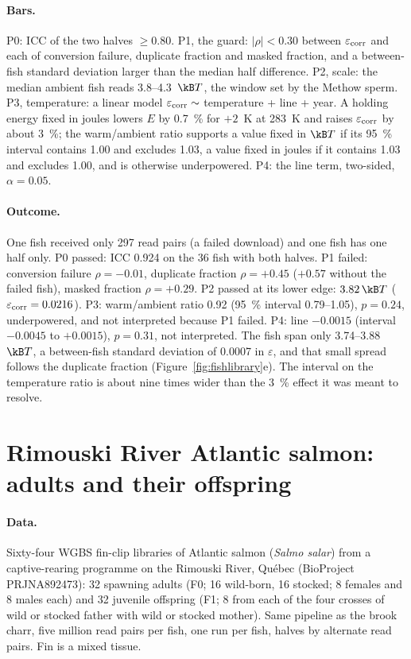\paragraph{Bars.} P0: ICC of the two halves $\ge0.80$. P1, the guard: $|\rho|<0.30$ between $\varepsilon_{\rm corr}$ and each of
conversion failure, duplicate fraction and masked fraction, and a between-fish standard deviation larger than the median
half difference. P2, scale: the median ambient fish reads 3.8--4.3~$\kB T$, the window set by the Methow sperm. P3, temperature:
a linear model $\varepsilon_{\rm corr}\sim$ temperature + line + year. A holding energy fixed in joules lowers $E$ by 0.7~\% for
$+2$~K at 283~K and raises $\varepsilon_{\rm corr}$ by about 3~\%; the warm/ambient ratio supports a value fixed in $\kB T$ if its
95~\% interval contains 1.00 and excludes 1.03, a value fixed in joules if it contains 1.03 and excludes 1.00, and is otherwise
underpowered. P4: the line term, two-sided, $\alpha=0.05$.

\paragraph{Outcome.} One fish received only 297 read pairs (a failed download) and one fish has one half only. P0 passed: ICC
0.924 on the 36 fish with both halves. P1 failed: conversion failure $\rho=-0.01$, duplicate fraction $\rho=+0.45$ ($+0.57$
without the failed fish), masked fraction $\rho=+0.29$. P2 passed at its lower edge: $3.82\,\kB T$ ($\varepsilon_{\rm corr}=0.0216$).
P3: warm/ambient ratio 0.92 (95~\% interval 0.79--1.05), $p=0.24$, underpowered, and not interpreted because P1 failed. P4: line
$-0.0015$ (interval $-0.0045$ to $+0.0015$), $p=0.31$, not interpreted. \measured{} The fish span only 3.74--3.88~$\kB T$, a
between-fish standard deviation of 0.0007 in $\varepsilon$, and that small spread follows the duplicate fraction
(Figure~\ref{fig:fishlibrary}e). The interval on the temperature ratio is about nine times wider than the 3~\% effect it was meant
to resolve.

\section{Rimouski River Atlantic salmon: adults and their offspring}

\paragraph{Data.} Sixty-four WGBS fin-clip libraries of Atlantic salmon (\emph{Salmo salar}) from a captive-rearing programme on
the Rimouski River, Qu\'ebec (BioProject PRJNA892473): 32 spawning adults (F0; 16 wild-born, 16 stocked; 8 females and 8 males
each) and 32 juvenile offspring (F1; 8 from each of the four crosses of wild or stocked father with wild or stocked mother). Same
pipeline as the brook charr, five million read pairs per fish, one run per fish, halves by alternate read pairs. Fin is a mixed
tissue.

